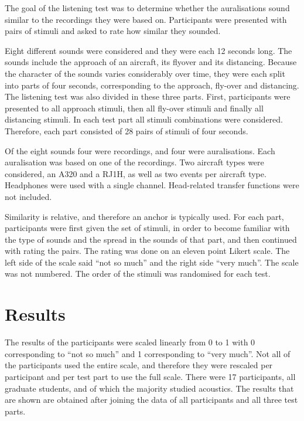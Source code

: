 The goal of the listening test was to determine whether the auralisations sound
similar to the recordings they were based on. Participants were presented with
pairs of stimuli and asked to rate how similar they sounded.


Eight different sounds were considered and they were each 12 seconds long. The
sounds include the approach of an aircraft, its flyover and its distancing.
Because the character of the sounds varies considerably over time, they were
each split into parts of four seconds, corresponding to the approach, fly-over
and distancing. The listening test was also divided in these three parts. First,
participants were presented to all approach stimuli, then all fly-over stimuli
and finally all distancing stimuli. In each test part all stimuli combinations
were considered. Therefore, each part consisted of 28 pairs of stimuli of four
seconds.

Of the eight sounds four were recordings, and four were auralisations. Each
auralisation was based on one of the recordings. Two aircraft types were
considered, an A320 and a RJ1H, as well as two events per aircraft type.
Headphones were used with a single channel. Head-related transfer functions were
not included.

Similarity is relative, and therefore an anchor is typically used. For each
part, participants were first given the set of stimuli, in order to become
familiar with the type of sounds and the spread in the sounds of that part, and
then continued with rating the pairs. The rating was done on an eleven point
Likert scale. The left side of the scale said ``not so much'' and the right side
``very much''. The scale was not numbered. The order of the stimuli was
randomised for each test.


\section{Results}
The results of the participants were scaled linearly from 0 to 1 with 0
corresponding to ``not so much'' and 1 corresponding to ``very much''. Not all
of the participants used the entire scale, and therefore they were rescaled per
participant and per test part to use the full scale. There were 17 participants,
all graduate students, and of which the majority studied acoustics. The results
that are shown are obtained after joining the data of all participants and all
three test parts.

